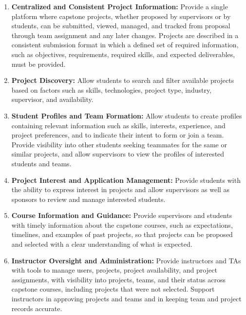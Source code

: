 \documentclass{article}
\begin{document}
\begin{enumerate}
    \item \textbf{Centralized and Consistent Project Information:}
        Provide a single platform where capstone projects, whether proposed by
        supervisors or by students, can be submitted, viewed, managed, and
        tracked from proposal through team assignment and any later changes.
        Projects are described in a consistent submission format in which a
        defined set of required information, such as objectives, requirements,
        required skills, and expected deliverables, must be provided.

    \item \textbf{Project Discovery:}
          Allow students to search and filter available projects based on factors such as skills, technologies, project type, industry, supervisor, and availability.

    \item \textbf{Student Profiles and Team Formation:}
        Allow students to create profiles containing relevant information such as skills, interests, experience,
        and project preferences, and to indicate their intent to form or join a team.
        Provide visibility into other students seeking teammates for the same or similar projects, and allow
        supervisors to view the profiles of interested students and teams.

    \item \textbf{Project Interest and Application Management:}
          Provide students with the ability to express interest in projects and allow supervisors as well as sponsors to review and manage interested students.

    \item \textbf{Course Information and Guidance:}
          Provide supervisors and students with timely information about the capstone courses,
          such as expectations, timelines, and examples of past projects, so that projects can be
          proposed and selected with a clear understanding of what is expected.

    \item \textbf{Instructor Oversight and Administration:}
          Provide instructors and TAs with tools to manage users, projects, project availability,
          and project assignments, with visibility into projects, teams, and their status across
          capstone courses, including projects that were not selected. Support instructors in approving projects
          and teams and in keeping team and project records accurate.

\end{enumerate}
\end{document}
